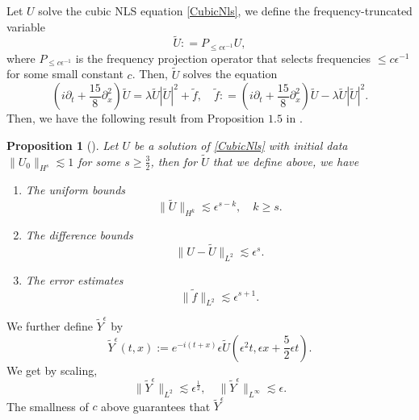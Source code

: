 \documentclass[12pt]{amsart}
\newtheorem{proposition}[theorem]{Proposition}
\theoremstyle{remark}
\theoremstyle{definition}
\numberwithin{equation}{section}
\newcommand{\e}{\epsilon}
\newcommand{\f}{\frac}
\begin{document}
Let $U$ solve the cubic NLS equation \eqref{CubicNls}, we define the frequency-truncated variable
\begin{equation*}
    \tilde{U} : = P_{\leq c\epsilon^{-1}}U,
\end{equation*}
where $P_{\leq c\epsilon^{-1}}$ is the frequency projection operator that selects frequencies $\leq c\epsilon^{-1}$ for some small constant $c$.
Then, $\tilde{U}$ solves the equation
\begin{equation*}
  \left(i\partial_t + \frac{15}{8}\partial_x^2 \right) \tilde{U} = \lambda \tilde{U}|\tilde{U}|^2 + \tilde{f},\quad \tilde{f}: = \left(i\partial_t + \frac{15}{8}\partial_x^2 \right) \tilde{U} - \lambda \tilde{U}|\tilde{U}|^2.
\end{equation*}
Then, we have the following result from Proposition $1.5$ in \cite{ifrim2019nls}.
\begin{proposition}[\hspace{1sp}\cite{ifrim2019nls}]
Let $U$ be a solution of \eqref{CubicNls} with initial data $\|U_0\|_{H^s} \lesssim 1$ for some $s\geq \frac{3}{2}$, then for $\tilde{U}$ that we define above, we have
\begin{enumerate}
\item The uniform bounds
\begin{equation*}
    \|\tilde{U}\|_{H^k} \lesssim \epsilon^{s-k}, \quad k \geq s.
\end{equation*}
\item The difference bounds
\begin{equation*}
 \|U - \tilde{U} \|_{L^2} \lesssim \epsilon^{s}.
\end{equation*}
\item The error estimates
\begin{equation*}
\|\tilde{f}\|_{L^2} \lesssim \epsilon^{s+1}.
\end{equation*}
\end{enumerate}
\end{proposition}
We further define $\tilde{Y}^\epsilon$ by
\begin{equation*}
    \tilde{Y}^\e(t,x):=e^{-i(t+x)}\epsilon\tilde{U}\left(\epsilon^2t, \e x+ \frac{5}{2}\e t \right).
\end{equation*}
We get by scaling,
\begin{equation} \label{TildeYEpsilonBound}
\|\tilde{Y}^\epsilon \|_{L^2} \lesssim \epsilon^\f12, \quad \|\tilde{Y}^\epsilon \|_{L^\infty} \lesssim \epsilon.
\end{equation}
The smallness of $c$ above
guarantees that $\tilde{Y}^{\e}$
\end{document}

